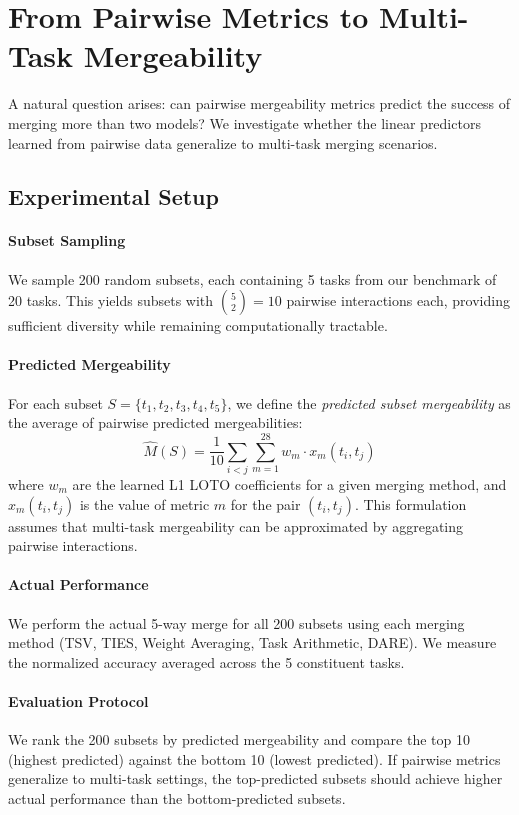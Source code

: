 \section{From Pairwise Metrics to Multi-Task Mergeability}
\label{sec:multitask_prediction}

A natural question arises: can pairwise mergeability metrics predict the success of merging more than two models? We investigate whether the linear predictors learned from pairwise data generalize to multi-task merging scenarios.

\subsection{Experimental Setup}

\paragraph{Subset Sampling}
We sample 200 random subsets, each containing 5 tasks from our benchmark of 20 tasks. This yields subsets with $\binom{5}{2} = 10$ pairwise interactions each, providing sufficient diversity while remaining computationally tractable.

\paragraph{Predicted Mergeability}
For each subset $S = \{t_1, t_2, t_3, t_4, t_5\}$, we define the \emph{predicted subset mergeability} as the average of pairwise predicted mergeabilities:
\begin{equation}
    \hat{M}(S) = \frac{1}{10} \sum_{i < j} \sum_{m=1}^{28} w_m \cdot x_m(t_i, t_j)
\end{equation}
where $w_m$ are the learned L1 LOTO coefficients for a given merging method, and $x_m(t_i, t_j)$ is the value of metric $m$ for the pair $(t_i, t_j)$. This formulation assumes that multi-task mergeability can be approximated by aggregating pairwise interactions.

\paragraph{Actual Performance}
We perform the actual 5-way merge for all 200 subsets using each merging method (TSV, TIES, Weight Averaging, Task Arithmetic, DARE). We measure the normalized accuracy averaged across the 5 constituent tasks.

\paragraph{Evaluation Protocol}
We rank the 200 subsets by predicted mergeability and compare the top 10 (highest predicted) against the bottom 10 (lowest predicted). If pairwise metrics generalize to multi-task settings, the top-predicted subsets should achieve higher actual performance than the bottom-predicted subsets.

